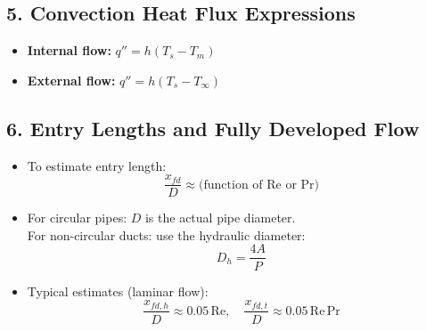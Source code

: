 \subsection*{5. Convection Heat Flux Expressions}

\begin{itemize}
    \item \textbf{Internal flow:} \quad \( q'' = h (T_s - T_m) \)
    \item \textbf{External flow:} \quad \( q'' = h (T_s - T_\infty) \)
\end{itemize}

\subsection*{6. Entry Lengths and Fully Developed Flow}

\begin{itemize}
    \item To estimate entry length:
    \[
    \frac{x_{fd}}{D} \approx \text{(function of Re or Pr)}
    \]
    \item For circular pipes: \( D \) is the actual pipe diameter. \\
          For non-circular ducts: use the hydraulic diameter:
    \[
    D_h = \frac{4A}{P}
    \]
    \item Typical estimates (laminar flow):
    \[
    \frac{x_{fd,h}}{D} \approx 0.05\,\mathrm{Re}, \quad
    \frac{x_{fd,t}}{D} \approx 0.05\,\mathrm{Re}\,\mathrm{Pr}
    \]
\end{itemize}

